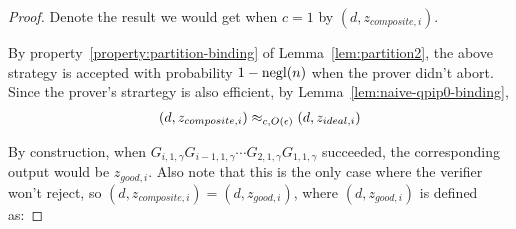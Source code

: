 \begin{proof}



Denote the result we would get when $c=1$ by $(d,z_{composite,i})$.

By  property~\ref{property:partition-binding} of Lemma~\ref{lem:partition2}, the above strategy is accepted with probability $1-\operatorname{negl}(n)$ when the prover didn't abort. Since the prover's strartegy is also efficient, by Lemma~\ref{lem:naive-qpip0-binding}, 
\begin{align}
    (d,z_{composite,i})\approx_{c, O(\epsilon)}(d,z_{ideal,i})
\end{align}



By construction, when $G_{i,1,\gamma}G_{i-1,1,\gamma} \cdots G_{2,1,\gamma}G_{1,1,\gamma}$ succeeded, the corresponding output would be $z_{good,i}$. Also note that this is the only case where the verifier won't reject, so $(d,z_{composite,i})=(d,z_{good,i})$, where $(d,z_{good,i})$ is defined as: 


\end{proof}
